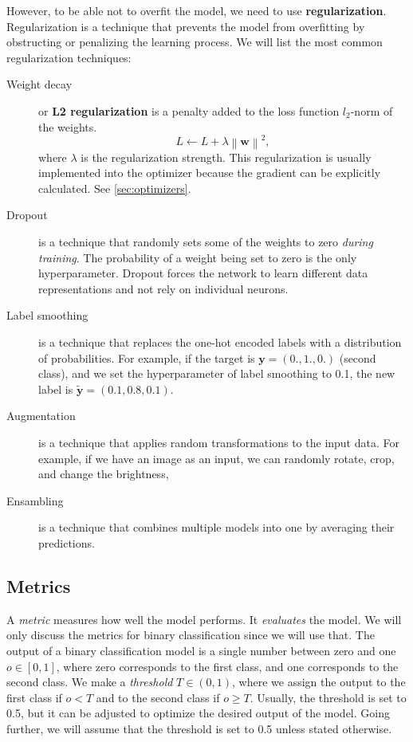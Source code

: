 However, to be able not to overfit the model, we need to use \textbf{regularization}. 
Regularization is a technique that prevents the model from overfitting by obstructing or penalizing the learning process.
We will list the most common regularization techniques:
\begin{description}
    \item[Weight decay] or \textbf{L2 regularization} is a penalty added to the loss function $l_2$-norm of the weights.
    \begin{equation}
        \label{eq:weight_decay}
        L \gets L + \lambda \left\lVert \pmb{w} \right\rVert^2,
    \end{equation}
    where $\lambda$ is the regularization strength.
    This regularization is usually implemented into the optimizer because the gradient can be explicitly calculated. 
    See \cref{sec:optimizers}. 
    \item[Dropout] is a technique that randomly sets some of the weights to zero \emph{during training}.  
    The probability of a weight being set to zero is the only hyperparameter.
    Dropout forces the network to learn different data representations and not rely on individual neurons.
    \item[Label smoothing] is a technique that replaces the one-hot encoded labels with a distribution of probabilities.
    For example, if the target is $\pmb{y} = (0., 1., 0.)$ (second class), and we set the hyperparameter of label smoothing to 0.1, the new label is $\tilde{\pmb{y}} = (0.1, 0.8, 0.1)$.
    \item[Augmentation] is a technique that applies random transformations to the input data.
    For example, if we have an image as an input, we can randomly rotate, crop, and change the brightness,
    \item[Ensambling] is a technique that combines multiple models into one by averaging their predictions.
\end{description}


\subsection{Metrics}
\label{sec:metrics}
A \emph{metric} measures how well the model performs. 
It \emph{evaluates} the model.
We will only discuss the metrics for binary classification since we will use that.
The output of a binary classification model is a single number between zero and one $o \in [0,1]$, where zero corresponds to the first class, and one corresponds to the second class.
We make a \emph{threshold} $T \in (0,1)$, where we assign the output to the first class if $o < T$ and to the second class if $o \geq T$. 
Usually, the threshold is set to 0.5, but it can be adjusted to optimize the desired output of the model.
Going further, we will assume that the threshold is set to 0.5 unless stated otherwise.

